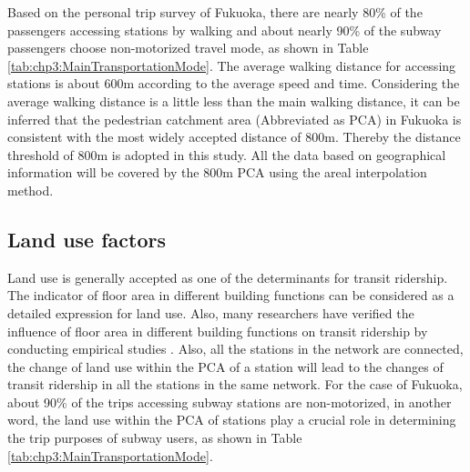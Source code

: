 %
Based on the personal trip survey of Fukuoka, there are nearly 80\% of the passengers accessing stations by walking and about nearly 90\% of the subway passengers choose non-motorized travel mode, as shown in Table \ref{tab:chp3:MainTransportationMode}. The average walking distance for accessing stations is about 600m according to the average speed and time. Considering the average walking distance is a little less than the main walking distance, it can be inferred that the pedestrian catchment area (Abbreviated as PCA) in Fukuoka is consistent with the most widely accepted distance of 800m. Thereby the distance threshold of 800m is adopted in this study. All the data based on geographical information will be covered by the 800m PCA using the areal interpolation method.

%
\subsection{Land use factors}
%
Land use is generally accepted as one of the determinants for transit ridership. The indicator of floor area in different building functions can be considered as a detailed expression for land use. Also, many researchers have verified the influence of floor area in different building functions on transit ridership by conducting empirical studies \cite{sohn2010factors,gutierrez2011transit,chakraborty2013land,chakraborty2013land,jun2015land}. Also, all the stations in the network are connected, the change of land use within the PCA of a station will lead to the changes of transit ridership in all the stations in the same network. For the case of Fukuoka, about 90\% of the trips accessing subway stations are non-motorized, in another word, the land use within the PCA of stations play a crucial role in determining the trip purposes of subway users, as shown in Table \ref{tab:chp3:MainTransportationMode}.

